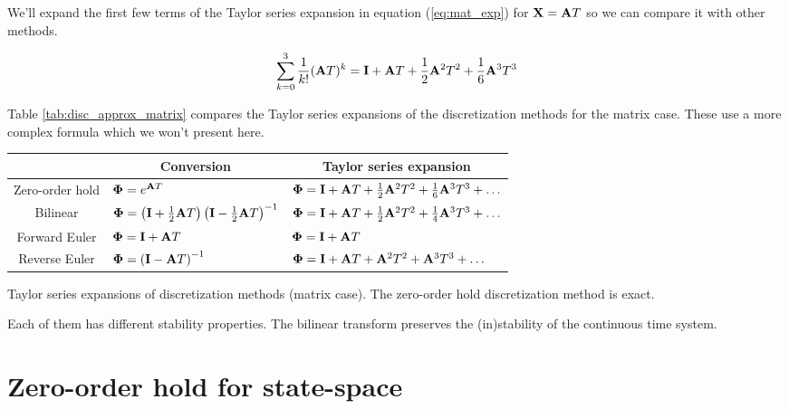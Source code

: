 We'll expand the first few terms of the Taylor series expansion in equation
(\ref{eq:mat_exp}) for $\mathbf{X} = \mathbf{A}T$ so we can compare it with other
methods.

\begin{equation*}
  \sum_{k=0}^3 \frac{1}{k!} (\mathbf{A}T)^k = \mathbf{I} + \mathbf{A}T +
    \frac{1}{2}\mathbf{A}^2T^2 + \frac{1}{6}\mathbf{A}^3T^3
\end{equation*}

Table \ref{tab:disc_approx_matrix} compares the Taylor series expansions of the
\gls{discretization} methods for the matrix case. These use a more complex
formula which we won't present here.

\begin{booktable}
  \begin{tabular}{|cll|}
    \hline
    \rowcolor{headingbg}
    \multicolumn{1}{|c}{\textbf{Method}} &
      \multicolumn{1}{c}{\textbf{Conversion}} &
      \multicolumn{1}{c|}{\textbf{Taylor series expansion}} \\
    \hline
    Zero-order hold &
      $\mathbf{\Phi} = e^{\mathbf{A}T}$ &
      $\mathbf{\Phi} = \mathbf{I} + \mathbf{A}T + \frac{1}{2}\mathbf{A}^2T^2 +
        \frac{1}{6}\mathbf{A}^3T^3 + \ldots$ \\
    Bilinear &
      $\mathbf{\Phi} =
        \left(\mathbf{I} + \frac{1}{2}\mathbf{A}T\right)
        \left(\mathbf{I} - \frac{1}{2}\mathbf{A}T\right)^{-1}$ &
      $\mathbf{\Phi} = \mathbf{I} + \mathbf{A}T + \frac{1}{2}\mathbf{A}^2T^2 +
        \frac{1}{4}\mathbf{A}^3T^3 + \ldots$ \\
    Forward Euler &
      $\mathbf{\Phi} = \mathbf{I} + \mathbf{A}T$ &
      $\mathbf{\Phi} = \mathbf{I} + \mathbf{A}T$ \\
    Reverse Euler &
      $\mathbf{\Phi} = \left(\mathbf{I} - \mathbf{A}T\right)^{-1}$ &
      $\mathbf{\Phi} =
        \mathbf{I} + \mathbf{A}T + \mathbf{A}^2T^2 + \mathbf{A}^3T^3 + \ldots$ \\
    \hline
  \end{tabular}
  \caption{Taylor series expansions of discretization methods (matrix case).
    The zero-order hold discretization method is exact.}
  \label{tab:disc_approx_matrix}
\end{booktable}

Each of them has different stability properties. The bilinear transform
preserves the (in)stability of the continuous time \gls{system}.

\section{Zero-order hold for state-space}

